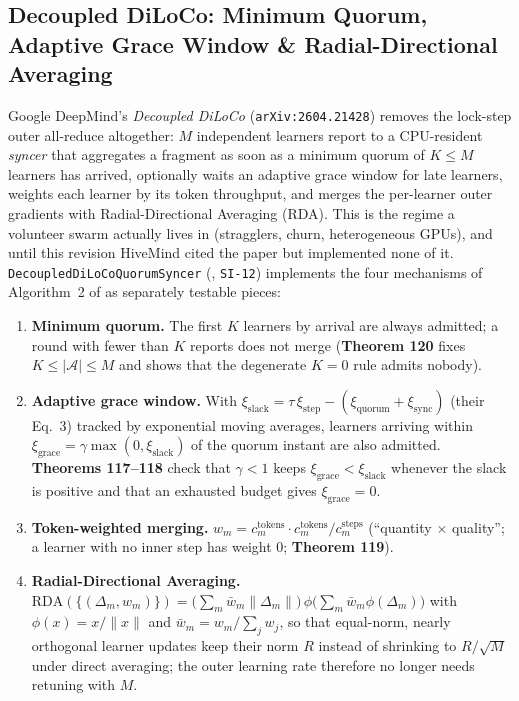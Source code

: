 \documentclass[11pt,a4paper]{article}
\begin{document}
\subsection{Decoupled DiLoCo: Minimum Quorum, Adaptive Grace Window \& Radial-Directional Averaging}
\label{sec:decoupled}

Google DeepMind's \textit{Decoupled DiLoCo} (\texttt{arXiv:2604.21428}) \cite{douillard2026decoupled} removes the lock-step outer all-reduce altogether: $M$ independent learners report to a CPU-resident \emph{syncer} that aggregates a fragment as soon as a minimum quorum of $K \le M$ learners has arrived, optionally waits an adaptive grace window for late learners, weights each learner by its token throughput, and merges the per-learner outer gradients with Radial-Directional Averaging (RDA). This is the regime a volunteer swarm actually lives in (stragglers, churn, heterogeneous GPUs), and until this revision HiveMind cited the paper but implemented none of it. \texttt{DecoupledDiLoCoQuorumSyncer} (, \texttt{SI-12}) implements the four mechanisms of Algorithm~2 of \cite{douillard2026decoupled} as separately testable pieces:
\begin{enumerate}[leftmargin=1.8em]
    \item \textbf{Minimum quorum.} The first $K$ learners by arrival are always admitted; a round with fewer than $K$ reports does not merge (\textbf{Theorem 120} fixes $K \le |\mathcal{A}| \le M$ and shows that the degenerate $K=0$ rule admits nobody).
    \item \textbf{Adaptive grace window.} With $\xi_{\text{slack}} = \tau\,\xi_{\text{step}} - (\xi_{\text{quorum}} + \xi_{\text{sync}})$ (their Eq.~3) tracked by exponential moving averages, learners arriving within $\xi_{\text{grace}} = \gamma \max(0, \xi_{\text{slack}})$ of the quorum instant are also admitted. \textbf{Theorems 117--118} check that $\gamma < 1$ keeps $\xi_{\text{grace}} < \xi_{\text{slack}}$ whenever the slack is positive and that an exhausted budget gives $\xi_{\text{grace}} = 0$.
    \item \textbf{Token-weighted merging.} $w_{m} = c^{\text{tokens}}_{m} \cdot c^{\text{tokens}}_{m} / c^{\text{steps}}_{m}$ (``quantity $\times$ quality''; a learner with no inner step has weight $0$; \textbf{Theorem 119}).
    \item \textbf{Radial-Directional Averaging.} $\text{RDA}(\{(\Delta_m, w_m)\}) = \big(\sum_m \bar w_m \|\Delta_m\|\big)\,\phi\big(\sum_m \bar w_m \phi(\Delta_m)\big)$ with $\phi(x) = x/\|x\|$ and $\bar w_m = w_m / \sum_j w_j$, so that equal-norm, nearly orthogonal learner updates keep their norm $R$ instead of shrinking to $R/\sqrt{M}$ under direct averaging; the outer learning rate therefore no longer needs retuning with $M$.
\end{enumerate}
\end{document}
